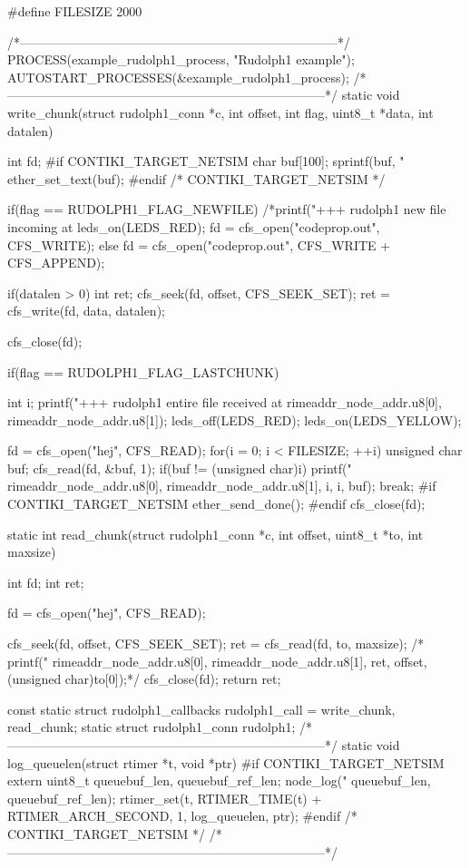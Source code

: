 \begin{DoxyCodeInclude}
#define FILESIZE 2000

/*---------------------------------------------------------------------------*/
PROCESS(example_rudolph1_process, "Rudolph1 example");
AUTOSTART_PROCESSES(&example_rudolph1_process);
/*---------------------------------------------------------------------------*/
static void
write_chunk(struct rudolph1_conn *c, int offset, int flag,
            uint8_t *data, int datalen)
{
  int fd;
#if CONTIKI_TARGET_NETSIM
  {
    char buf[100];
    sprintf(buf, "%
    ether_set_text(buf);
  }
#endif /* CONTIKI_TARGET_NETSIM */

  if(flag == RUDOLPH1_FLAG_NEWFILE) {
    /*printf("+++ rudolph1 new file incoming at %
    leds_on(LEDS_RED);
    fd = cfs_open("codeprop.out", CFS_WRITE);
  } else {
    fd = cfs_open("codeprop.out", CFS_WRITE + CFS_APPEND);
  }
  
  if(datalen > 0) {
    int ret;
    cfs_seek(fd, offset, CFS_SEEK_SET);
    ret = cfs_write(fd, data, datalen);
  }

  cfs_close(fd);

  if(flag == RUDOLPH1_FLAG_LASTCHUNK) {
    int i;
    printf("+++ rudolph1 entire file received at %
           rimeaddr_node_addr.u8[0], rimeaddr_node_addr.u8[1]);
    leds_off(LEDS_RED);
    leds_on(LEDS_YELLOW);

    fd = cfs_open("hej", CFS_READ);
    for(i = 0; i < FILESIZE; ++i) {
      unsigned char buf;
      cfs_read(fd, &buf, 1);
      if(buf != (unsigned char)i) {
        printf("%
               rimeaddr_node_addr.u8[0], rimeaddr_node_addr.u8[1],
               i, i, buf);
        break;
      }
    }
#if CONTIKI_TARGET_NETSIM
    ether_send_done();
#endif
    cfs_close(fd);
  }
}
static int
read_chunk(struct rudolph1_conn *c, int offset, uint8_t *to, int maxsize)
{
  int fd;
  int ret;
  
  fd = cfs_open("hej", CFS_READ);

  cfs_seek(fd, offset, CFS_SEEK_SET);
  ret = cfs_read(fd, to, maxsize);
  /*  printf("%
         rimeaddr_node_addr.u8[0], rimeaddr_node_addr.u8[1],
         ret, offset, (unsigned char)to[0]);*/
  cfs_close(fd);
  return ret;
}
const static struct rudolph1_callbacks rudolph1_call = {write_chunk,
                                                        read_chunk};
static struct rudolph1_conn rudolph1;
/*---------------------------------------------------------------------------*/
static void
log_queuelen(struct rtimer *t, void *ptr)
{
#if CONTIKI_TARGET_NETSIM
  extern uint8_t queuebuf_len, queuebuf_ref_len;
  node_log("%
           queuebuf_len,
           queuebuf_ref_len);
  rtimer_set(t, RTIMER_TIME(t) + RTIMER_ARCH_SECOND, 1,
             log_queuelen, ptr);
#endif /* CONTIKI_TARGET_NETSIM */
}
/*---------------------------------------------------------------------------*/


\end{DoxyCodeInclude}
